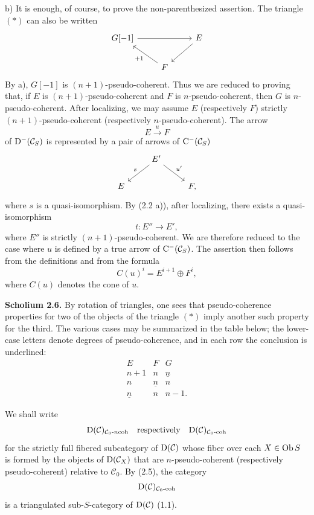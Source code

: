 \documentclass[11pt]{article}
\begin{document}
b) It is enough, of course, to prove the non-parenthesized assertion. The triangle \((*)\) can also be written
\[
\begin{tikzcd}
G[-1] \arrow[rr] && E \arrow[dl]\\
& F \arrow[ul,"+1"] &
\end{tikzcd}
\]
By a), \(G[-1]\) is \((n+1)\)-pseudo-coherent. Thus we are reduced to proving that, if \(E\) is \((n+1)\)-pseudo-coherent and \(F\) is \(n\)-pseudo-coherent, then \(G\) is \(n\)-pseudo-coherent. After localizing, we may assume \(E\) (respectively \(F\)) strictly \((n+1)\)-pseudo-coherent (respectively \(n\)-pseudo-coherent). The arrow
\[
  E\xrightarrow{u}F
\]
of \(\mathrm D^-(\mathcal C_S)\) is represented by a pair of arrows of \(\mathrm C^-(\mathcal C_S)\)
\[
\begin{tikzcd}
& E' \arrow[dl,"s"'] \arrow[dr,"u'"]\\
E && F ,
\end{tikzcd}
\]
where \(s\) is a quasi-isomorphism. By (2.2 a)), after localizing, there exists a quasi-isomorphism
\[
  t:E''\longrightarrow E',
\]
where \(E''\) is strictly \((n+1)\)-pseudo-coherent. We are therefore reduced to the case where \(u\) is defined by a true arrow of \(\mathrm C^-(\mathcal C_S)\). The assertion then follows from the definitions and from the formula
\[
  C(u)^i=E^{i+1}\oplus F^i,
\]
where \(C(u)\) denotes the cone of \(u\).

\textbf{Scholium 2.6.} By rotation of triangles, one sees that pseudo-coherence properties for two of the objects of the triangle \((*)\) imply another such property for the third. The various cases may be summarized in the table below; the lower-case letters denote degrees of pseudo-coherence, and in each row the conclusion is underlined:
\[
\begin{array}{ccc}
E&F&G\\[0.2em]
n+1&n&\underline n\\
n&\underline n&n\\
\underline n&n&n-1 .
\end{array}
\]

We shall write
\[
  \mathrm D(\mathcal C)_{\mathcal C_0\text{-}n\mathrm{coh}}
  \quad\text{respectively}\quad
  \mathrm D(\mathcal C)_{\mathcal C_0\text{-}\mathrm{coh}}
\]
for the strictly full fibered subcategory of \(\mathrm D(\mathcal C)\) whose fiber over each \(X\in\operatorname{Ob} S\) is formed by the objects of \(\mathrm D(\mathcal C_X)\) that are \(n\)-pseudo-coherent (respectively pseudo-coherent) relative to \(\mathcal C_0\). By (2.5), the category
\[
  \mathrm D(\mathcal C)_{\mathcal C_0\text{-}\mathrm{coh}}
\]
is a triangulated sub-\(S\)-category of \(\mathrm D(\mathcal C)\) (1.1).
\end{document}
